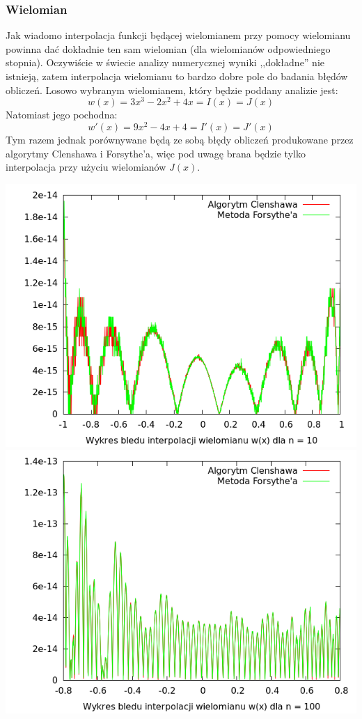\documentclass[11pt,leqno]{article}
\begin{document}
\subsubsection{Wielomian}
Jak wiadomo interpolacja funkcji będącej wielomianem przy pomocy wielomianu powinna dać dokładnie ten sam wielomian (dla wielomianów odpowiedniego stopnia). Oczywiście w świecie analizy numerycznej wyniki ,,dokładne'' nie istnieją, zatem interpolacja wielomianu to bardzo dobre pole do badania błędów obliczeń. Losowo wybranym wielomianem, który będzie poddany analizie jest:
\[
  w(x) = 3 x^3 - 2 x^2 + 4 x = I(x) = J(x)
\]
Natomiast jego pochodna:
\[
  w'(x) = 9 x^2 - 4 x + 4 = I'(x) = J'(x)
\]
Tym razem jednak porównywane będą ze sobą błędy obliczeń produkowane przez algorytmy Clenshawa i Forsythe'a, więc pod uwagę brana będzie tylko interpolacja przy użyciu wielomianów $J(x)$.

\begin{center}
\includegraphics[scale=0.65,natwidth=640,natheight=480]{plot/poly10e.png}\\
\includegraphics[scale=0.65,natwidth=640,natheight=480]{plot/poly100ezoom.png}\\
\end{center}
\end{document}
